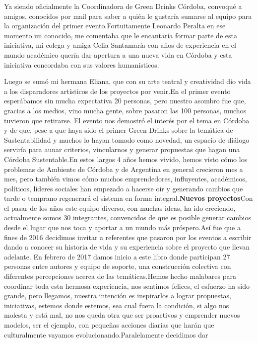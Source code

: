\begin{fullwidth}
Ya siendo oficialmente la Coordinadora de Green Drinks Córdoba, convoqué
a amigos, conocidos por mail para saber a quién le gustaría sumarse al
equipo para la organización del primer evento.Fortuitamente Leonardo
Peralta en ese momento un conocido, me comentaba que le encantaría
formar parte de esta iniciativa, mi colega y amiga Celia Santamaría con
años de experiencia en el mundo académico quería dar apertura a una
nueva vida en Córdoba y esta iniciativa concordaba con sus valores
humanísticos.

Luego se sumó mi hermana Eliana, que con su arte teatral y creatividad
dio vida a los disparadores artísticos de los proyectos por venir.En el
primer evento esperábamos sin mucha expectativa 20 personas, pero
nuestro asombro fue que, gracias a los medios, vino mucha gente, sobre
pasaron las 100 personas, muchos tuvieron que retirarse. El evento nos
demostró el interés por el tema en Córdoba y de que, pese a que haya
sido el primer Green Drinks sobre la temática de Sustentabilidad y
muchos lo hayan tomado como novedad, un espacio de diálogo serviría para
aunar criterios, vincularnos y generar propuestas que hagan una Córdoba
Sustentable.En estos largos 4 años hemos vivido, hemos visto cómo los
problemas de Ambiente de Córdoba y de Argentina en general crecieron mes
a mes, pero también vimos cómo muchos emprendedores, influyentes,
académicos, políticos, líderes sociales han empezado a hacerse oír y
generando cambios que tarde o temprano regenerará el sistema en forma
integral.\textbf{Nuevos proyectos}Con el pasar de los años este equipo
diverso, con muchas ideas, ha ido creciendo, actualmente somos 30
integrantes, convencidos de que es posible generar cambios desde el
lugar que nos toca y aportar a un mundo más próspero.Así fue que a fines
de 2016 decidimos invitar a referentes que pasaron por los eventos a
escribir dando a conocer su historia de vida y su experiencia sobre el
proyecto que llevan adelante. En febrero de 2017 damos inicio a este
libro donde participan 27 personas entre autores y equipo de soporte,
una construcción colectiva con diferentes percepciones acerca de las
temáticas.Hemos hecho malabares para coordinar toda esta hermosa
experiencia, nos sentimos felices, el esfuerzo ha sido grande, pero
llegamos, nuestra intención es inspirarlos a lograr propuestas,
iniciativas, estemos donde estemos, sea cual fuera la condición, si algo
nos molesta y está mal, no nos queda otra que ser proactivos y emprender
nuevos modelos, ser el ejemplo, con pequeñas acciones diarias que harán
que culturalmente vayamos evolucionando.Paralelamente decidimos dar

\end{fullwidth}

